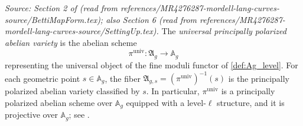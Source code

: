 \begin{definition}
  \label{def:universal_av}
  \textit{Source: Section 2 of \cite{MR4276287-mordell-lang-curves} (read from
  references/MR4276287-mordell-lang-curves-source/BettiMapForm.tex); also Section 6 (read
  from references/MR4276287-mordell-lang-curves-source/SettingUp.tex).}
  The \emph{universal principally polarized abelian variety} is the abelian scheme
  \[
    \pi^{\mathrm{univ}} \colon \mathfrak{A}_g \longrightarrow \mathbb{A}_g
  \]
  representing the universal object of the fine moduli functor of \cref{def:Ag_level}.
  For each geometric point \(s \in \mathbb{A}_g\), the fiber
  \(\mathfrak{A}_{g,s} = (\pi^{\mathrm{univ}})^{-1}(s)\) is the principally
  polarized abelian variety classified by \(s\). In particular, \(\pi^{\mathrm{univ}}\)
  is a principally polarized abelian scheme over \(\mathbb{A}_g\) equipped with
  a level-\(\ell\) structure, and it is projective over \(\mathbb{A}_g\); see
  \cite[Remark~\ref*{rmk:projembedding}]{MR4276287-mordell-lang-curves}.
\end{definition}

